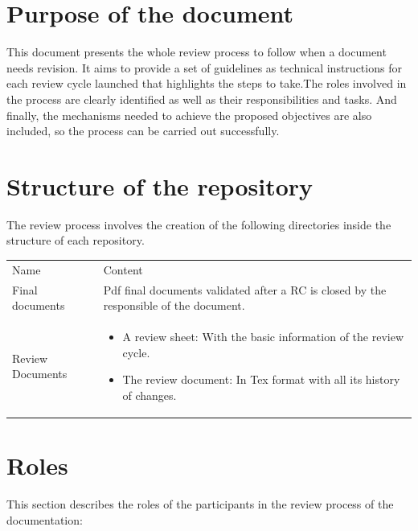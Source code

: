 \documentclass{template/openetcs_article}
\begin{document}
\newpage

\section[Introduction]{Purpose of the document}
This document presents the whole review process to follow when a document needs revision. It aims to provide a set of guidelines as technical instructions for each review cycle launched that highlights the steps to take.The roles involved in the process are clearly identified as well as their responsibilities and tasks. And finally, the mechanisms needed to achieve the proposed objectives are also included, so the process can be carried out successfully.

\section{Structure of the repository}
 
The review process involves the creation of the following directories inside the structure of each repository. 

\begin{flushleft}

\begin{tabular}{|m{3cm}|m{11cm}|}
\hline
\rowcolor{myblue}
\multicolumn{2}{|c|}{Structure of the repository} \\\hline
\rowcolor{lightgray}
Name &
Content 
\\\hline
Final documents &
Pdf final documents validated after a RC is closed by the responsible of the document.\\\hline
Review Documents &
\begin{itemize}
\item A review sheet: With the basic information of the review cycle.
\item The review document: In Tex format with all its history of changes.
\end{itemize}\\\hline
\end{tabular}
\end{flushleft}

\section{Roles}


This section describes  the roles of the participants in the review process of the documentation:
\end{document}
